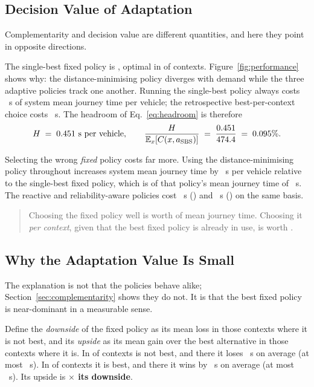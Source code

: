

\subsection{Decision Value of Adaptation}

Complementarity and decision value are different quantities, and here they point
in opposite directions.

The single-best fixed policy is \NumGlobalSBS{}, optimal in \NumSBSOptimalPct{}
of contexts. Figure~\ref{fig:performance} shows why: the distance-minimising policy
diverges with demand while the three adaptive policies track one another.
Running the single-best policy always costs \NumSBSMeanCost~s of system mean
journey time per vehicle; the retrospective best-per-context choice costs
\NumCostVBS~s. The headroom of Eq.~\ref{eq:headroom} is therefore
\begin{equation}
H \;=\; 0.451\ \text{s per vehicle},
\qquad
\frac{H}{\mathbb{E}_x[C(x,a_{\mathrm{SBS}})]}
\;=\; \frac{0.451}{474.4} \;=\; 0.095\% .
\end{equation}

Selecting the wrong \emph{fixed} policy costs far more. Using the
distance-minimising policy throughout increases system mean journey time by
\NumFixedPenAbsPOne~s per vehicle relative to the single-best fixed policy, which
is \NumFixedPenPctAbsPOne{} of that policy's mean journey time of
\NumSBSMeanCost~s. The reactive and reliability-aware policies cost
\NumFixedPenPTwo~s (\NumFixedPenPctPTwo{}) and \NumFixedPenPFour~s
(\NumFixedPenPctPFour{}) on the same basis.

\begin{quote}
Choosing the fixed policy well is worth \NumFixedPenPctAbsPOne{} of mean journey
time. Choosing it \emph{per context}, given that the best fixed policy is
already in use, is worth \NumHeadroomPct{}.
\end{quote}

\subsection{Why the Adaptation Value Is Small}
\label{sec:asymmetry}

The explanation is not that the policies behave alike; Section~\ref{sec:complementarity} shows they do
not. It is that the best fixed policy is near-dominant in a measurable sense.

Define the \emph{downside} of the fixed policy as its mean loss in those
contexts where it is not best, and its \emph{upside} as its mean gain over the
best alternative in those contexts where it is. In \NumAsymNotBestPct{} of
contexts \NumGlobalSBS{} is not best, and there it loses \NumAsymLoss~s on
average (at most \NumAsymMaxLoss~s). In \NumAsymBestPct{} of contexts it is
best, and there it wins by \NumAsymMargin~s on average (at most
\NumAsymMaxMargin~s). Its upside is \textbf{\NumAsymRatio$\times$ its
downside}.

